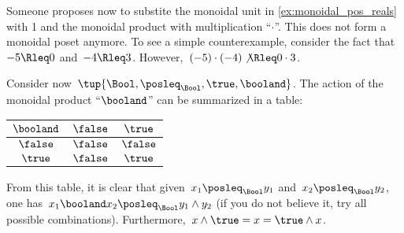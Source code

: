 \begin{example}
  Someone proposes now to substite the monoidal unit in \cref{ex:monoidal_pos_reals} with 1 and the monoidal product with
  multiplication ``$\cdot$''. This does not form a monoidal poset anymore. To see a simple counterexample, consider the fact that~$-5\Rleq 0$ and~$-4\Rleq 3$. However,~$(-5)\cdot (-4) \not{\Rleq} 0 \cdot 3$.
\end{example}

\begin{example}
  Consider now~$\tup{\Bool,\posleq_{\Bool},\true,\booland}$. The action of the monoidal product ``$\booland$'' can be summarized in a table:
  \begin{center}
    \begin{tabular}{c|cc}
      $\booland$ & $\false$ & $\true$  \\
      \hline
      $\false$ & $\false$ & $\false$ \\
      $\true$  & $\false$ & $\true$
    \end{tabular}
  \end{center}
  From this table, it is clear that given~$x_1\posleq_{\Bool}y_1$ and~$x_2\posleq_{\Bool} y_2$, one has~$x_1\booland x_2\posleq_{\Bool} y_1\wedge y_2$ (if you do not believe it, try all possible combinations). Furthermore,~$x\wedge \true=x=\true \wedge x$.
\end{example}
